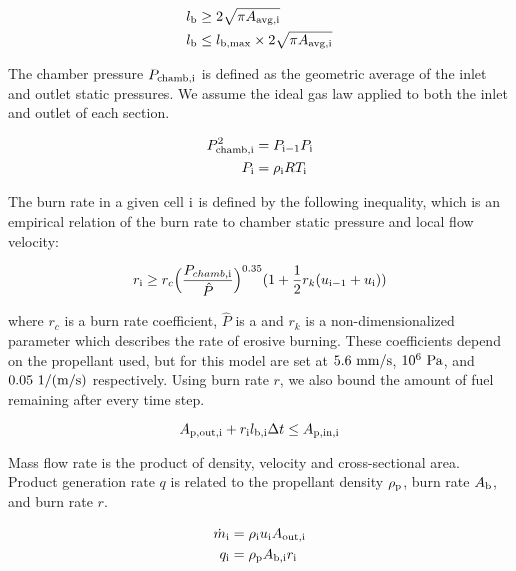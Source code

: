 \begin{align}
    l_{\rm{b}} &\geq 2 \sqrt{\pi A_{\rm{avg, i}}} \\
    l_{\rm{b}} &\leq l_{\rm{b,max}} \times 2 \sqrt{\pi A_{\rm{avg, i}}}
\end{align}

The chamber pressure $P_{\rm{chamb}, \rm{i}}$ is defined as the geometric average of
the inlet and outlet static pressures. We assume the ideal gas law applied to both
the inlet and outlet of each section.

\begin{align}
    P_{\rm{chamb}, \rm{i}}^2 &= P_{\rm{i}-1} P_{\rm{i}} \\
    P_{\rm{i}} &= \rho_{\rm{i}} R T_{\rm{i}} \\
\end{align}

The burn rate in a given cell $\rm{i}$ is defined by the following inequality,
which is an empirical relation of the burn rate to chamber static
pressure and local flow velocity:

\begin{equation}
r_{\rm{i}} \geq r_c  \Big(\frac{P_{chamb,\rm{i}}}{\hat{P}}\Big)^{0.35} (1 + \frac{1}{2} r_k (u_{\rm{i}-1} + u_{\rm{i}}))
\end{equation}

where $r_c$ is a burn rate coefficient, $\hat{P}$ is a and $r_k$ is a non-dimensionalized parameter
which describes the rate of erosive burning. These coefficients
depend on the propellant used, but for this model are set at
$5.6~\rm{mm/s}$, $10^{6}~\rm{Pa}$, and $0.05~\rm{1/(m/s)}$ respectively. Using burn rate $r$,
we also bound the amount of fuel remaining after every time step.

\begin{equation}
    A_{\rm{p, out, i}} + r_{\rm{i}} l_{\rm{b, i}} \Delta t \leq A_{\rm{p, in, i}}
\end{equation}

Mass flow rate is the product of density, velocity and cross-sectional area.
Product generation rate $q$ is related to the propellant density $\rho_{\rm{p}}$,
burn rate $A_{\rm{b}}$, and burn rate $r$.

\begin{align}
    \dot{m}_{\rm{i}} &= \rho_{\rm{i}} u_{\rm{i}} A_{\rm{out}, \rm{i}} \\
    q_{\rm{i}} &= \rho_{\rm{p}} A_{\rm{b, i}} r_{\rm{i}} \\
\end{align}

